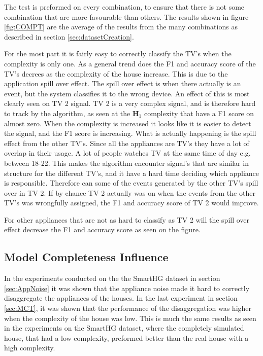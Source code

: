 The test is preformed on every combination, to ensure that there is not some combination that are more favourable than others. The results shown in figure \ref{fig:COMPT} are the average of the results from the many combinations as described in section \ref{sec:datasetCreation}. 

For the most part it is fairly easy to correctly classify the TV's when the complexity is only one. As a general trend does the F1 and accuracy score of the TV's decrees as the complexity of the house increase. This is due to the application spill over effect. The spill over effect is when there actually is an event, but the system classifies it to the wrong device.  An effect of this is most clearly seen on TV 2 signal. TV 2 is a very complex signal, and is therefore hard to track by the algorithm, as seen at the $\textbf{H}_1$ complexity that have a F1 score on almost zero. When the complexity is increased it looks like it is easier to detect the signal, and the F1 score is increasing. What is actually happening is the spill effect from the other TV's. Since all the appliances are TV's they have a lot of overlap in their usage. A lot of people watches TV at the same time of day e.g. between 18-22. This makes the algorithm encounter signal's that are similar in structure for the different TV's, and it have a hard time deciding which appliance is responsible. Therefore can some of the events generated by the other TV's spill over in TV 2. If by chance TV 2 actually was on when the events from the other TV's was wrongfully assigned, the F1 and accuracy score of TV 2 would improve. 

For other appliances that are not as hard to classify as TV 2 will the spill over effect decrease the F1 and accuracy score as seen on the figure. 

\subsection{Model Completeness Influence }
In the experiments conducted on the the SmartHG dataset in section \ref{sec:AppNoise} it was shown that the appliance noise made it hard to correctly disaggregate the appliances of the houses. In the last experiment in section \ref{sec:MCT}, it was shown that the performance of the disaggregation was higher when the complexity of the house was low. This is much the same results as seen in the experiments on the SmartHG dataset, where the completely simulated house, that had a low complexity, preformed better than the real house with a high complexity. 


